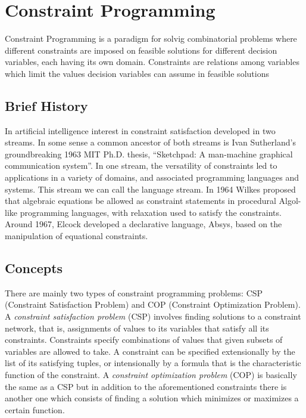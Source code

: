 \section{Constraint Programming}\label{sec:constraint_programming}

Constraint Programming is a paradigm for solvig combinatorial problems where
different constraints are imposed on feasible solutions for different decision variables, each having
its own domain. Constraints are relations among variables which limit the values decision variables
can assume in feasible solutions \cite{10.5555/2843512}

\subsection{Brief History}\label{subsec:brief_history_cp}
In artificial intelligence interest in constraint satisfaction developed in two streams. In
some sense a common ancestor of both streams is Ivan Sutherland’s groundbreaking 1963
MIT Ph.D. thesis, “Sketchpad: A man-machine graphical communication system”.
In one stream, the versatility of constraints led to applications in a variety of domains,
and associated programming languages and systems. This stream we can call the language
stream. In 1964 Wilkes proposed that algebraic equations be allowed as constraint statements
in procedural Algol-like programming languages, with relaxation used to satisfy the
constraints. Around 1967, Elcock developed a declarative language, Absys, based on
the manipulation of equational constraints.

\subsection{Concepts}\label{subsec:concepts_cp}

There are mainly two types of constraint programming problems: CSP (Constraint Satisfaction Problem) and COP (Constraint Optimization Problem).\newline\newline
A \textit{constraint satisfaction problem} (CSP) involves finding solutions to a constraint network,
that is, assignments of values to its variables that satisfy all its constraints. Constraints
specify combinations of values that given subsets of variables are allowed to take.\newline
A constraint can be specified extensionally by the list of its satisfying tuples, or intensionally
by a formula that is the characteristic function of the constraint.\newline\newline
A \textit{constraint optimization problem} (COP) is basically the same as a CSP but in addition to the aforementioned constraints there is another one
which consists of finding a solution which minimizes or maximizes a certain function.


